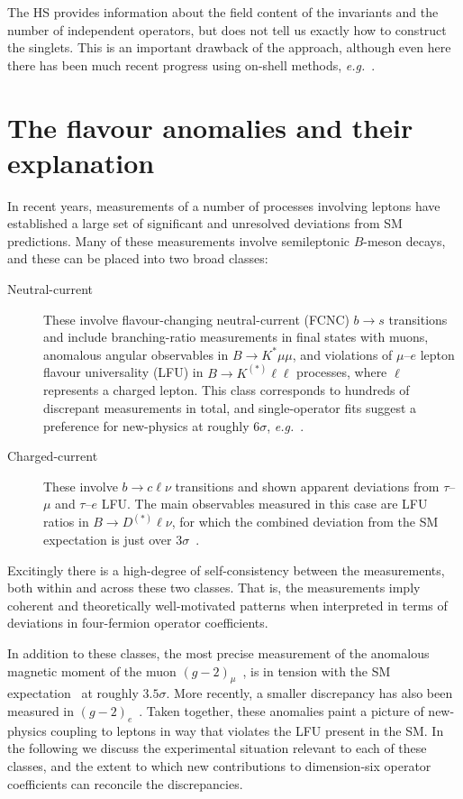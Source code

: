 The HS provides information about the field content of the invariants and the
number of independent operators, but does not tell us exactly how to construct
the singlets. This is an important drawback of the approach, although even here
there has been much recent progress using on-shell methods,
\textit{e.g.}~\cite{Ma:2019gtx, Henning:2019enq, Li:2020gnx, Li:2020xlh}.



\section{The flavour anomalies and their explanation}
\label{sec:ch1-flavour-anomalies}

In recent years, measurements of a number of processes involving leptons have
established a large set of significant and unresolved deviations from SM
predictions. Many of these measurements involve semileptonic $B$-meson decays,
and these can be placed into two broad classes:
\begin{description}
  \item[Neutral-current] These involve flavour-changing neutral-current (FCNC) $b \to s$ transitions and include branching-ratio measurements in final states with muons, anomalous angular observables in $B \to K^{*} \mu\mu$, and violations of $\mu$--$e$ lepton flavour universality (LFU) in $B \to K^{(*)} \ell \ell$ processes, where $\ell$ represents a charged lepton. This class corresponds to hundreds of discrepant measurements in total, and single-operator fits suggest a preference for new-physics at roughly $6\sigma$, \textit{e.g.}~\cite{Aebischer:2019mlg}.
  \item[Charged-current] These involve $b \to c \ell \nu$ transitions and shown apparent deviations from $\tau$--$\mu$ and $\tau$--$e$ LFU. The main observables measured in this case are LFU ratios in $B \to D^{(*)} \ell \nu$, for which the combined deviation from the SM expectation is just over $3\sigma$~\cite{Amhis:2019ckw}.
\end{description}
Excitingly there is a high-degree of self-consistency between the measurements,
both within and across these two classes. That is, the measurements imply
coherent and theoretically well-motivated patterns when interpreted in terms of
deviations in four-fermion operator coefficients.

In addition to these classes, the most precise measurement of the anomalous
magnetic moment of the muon $(g-2)_{\mu}$~\cite{Bennett:2006fi}, is in tension
with the SM expectation~\cite{Blum:2013xva} at roughly $3.5\sigma$. More
recently, a smaller discrepancy has also been measured in
$(g-2)_{e}$~\cite{Articleparker, PMID:33268866}. Taken together, these anomalies
paint a picture of new-physics coupling to leptons in way that violates the LFU
present in the SM. In the following we discuss the experimental situation
relevant to each of these classes, and the extent to which new contributions to
dimension-six operator coefficients can reconcile the discrepancies.

